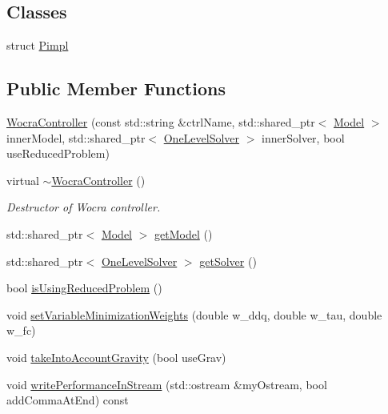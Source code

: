 \subsection*{Classes}
\begin{DoxyCompactItemize}
\item 
struct \hyperlink{structwocra_1_1WocraController_1_1Pimpl}{Pimpl}
\end{DoxyCompactItemize}
\subsection*{Public Member Functions}
\begin{DoxyCompactItemize}
\item 
\hyperlink{classwocra_1_1WocraController_ae14fda387f6d308aead6ab7a59e82e74}{Wocra\+Controller} (const std\+::string \&ctrl\+Name, std\+::shared\+\_\+ptr$<$ \hyperlink{classocra_1_1Model}{Model} $>$ inner\+Model, std\+::shared\+\_\+ptr$<$ \hyperlink{classocra_1_1OneLevelSolver}{One\+Level\+Solver} $>$ inner\+Solver, bool use\+Reduced\+Problem)
\item 
virtual \hyperlink{classwocra_1_1WocraController_a4051d9aab485cfa444ed90da795f2bb2}{$\sim$\+Wocra\+Controller} ()
\begin{DoxyCompactList}\small\item\em Destructor of Wocra controller. \end{DoxyCompactList}\item 
std\+::shared\+\_\+ptr$<$ \hyperlink{classocra_1_1Model}{Model} $>$ \hyperlink{classwocra_1_1WocraController_adc7f78b5f888c76a3296cfd5882caad1}{get\+Model} ()
\item 
std\+::shared\+\_\+ptr$<$ \hyperlink{classocra_1_1OneLevelSolver}{One\+Level\+Solver} $>$ \hyperlink{classwocra_1_1WocraController_a94f67ee0ae6985969f4f1798bde0a9db}{get\+Solver} ()
\item 
bool \hyperlink{classwocra_1_1WocraController_a89eab1194e0598d8b30730429f286450}{is\+Using\+Reduced\+Problem} ()
\item 
void \hyperlink{classwocra_1_1WocraController_a23b01d7dad39803132d69ae335212615}{set\+Variable\+Minimization\+Weights} (double w\+\_\+ddq, double w\+\_\+tau, double w\+\_\+fc)
\item 
void \hyperlink{classwocra_1_1WocraController_a339cb7de07b9766aba4b3d1cfd6a78d4}{take\+Into\+Account\+Gravity} (bool use\+Grav)
\item 
void \hyperlink{classwocra_1_1WocraController_ac7afeae13732d4c92cd7d891c0dd0cfb}{write\+Performance\+In\+Stream} (std\+::ostream \&my\+Ostream, bool add\+Comma\+At\+End) const 

\end{DoxyCompactItemize}
